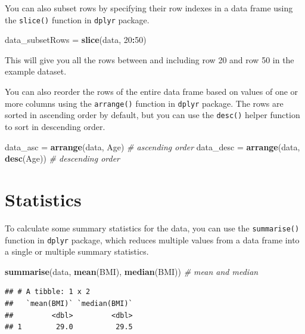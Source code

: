 \documentclass[
]{article}
\newenvironment{Shaded}{\begin{snugshade}}{\end{snugshade}}
\newcommand{\CommentTok}[1]{\textcolor[rgb]{0.56,0.35,0.01}{\textit{#1}}}
\newcommand{\DecValTok}[1]{\textcolor[rgb]{0.00,0.00,0.81}{#1}}
\newcommand{\FunctionTok}[1]{\textcolor[rgb]{0.13,0.29,0.53}{\textbf{#1}}}
\newcommand{\NormalTok}[1]{#1}
\newcommand{\OtherTok}[1]{\textcolor[rgb]{0.56,0.35,0.01}{#1}}
\newcommand{\SpecialCharTok}[1]{\textcolor[rgb]{0.81,0.36,0.00}{\textbf{#1}}}
\begin{document}
You can also subset rows by specifying their row indexes in a data frame
using the \texttt{slice()} function in \texttt{dplyr} package.

\begin{Shaded}
\begin{Highlighting}[]
\NormalTok{data\_subsetRows }\OtherTok{=} \FunctionTok{slice}\NormalTok{(data, }\DecValTok{20}\SpecialCharTok{:}\DecValTok{50}\NormalTok{)}
\end{Highlighting}
\end{Shaded}

This will give you all the rows between and including row 20 and row 50
in the example dataset.

You can also reorder the rows of the entire data frame based on values
of one or more columns using the \texttt{arrange()} function in
\texttt{dplyr} package. The rows are sorted in ascending order by
default, but you can use the \texttt{desc()} helper function to sort in
descending order.

\begin{Shaded}
\begin{Highlighting}[]
\NormalTok{data\_asc }\OtherTok{=} \FunctionTok{arrange}\NormalTok{(data, Age) }\CommentTok{\# ascending order}
\NormalTok{data\_desc }\OtherTok{=} \FunctionTok{arrange}\NormalTok{(data, }\FunctionTok{desc}\NormalTok{(Age)) }\CommentTok{\# descending order}
\end{Highlighting}
\end{Shaded}

\section{Statistics}\label{statistics}

To calculate some summary statistics for the data, you can use the
\texttt{summarise()} function in \texttt{dplyr} package, which reduces
multiple values from a data frame into a single or multiple summary
statistics.

\begin{Shaded}
\begin{Highlighting}[]
\FunctionTok{summarise}\NormalTok{(data, }\FunctionTok{mean}\NormalTok{(BMI), }\FunctionTok{median}\NormalTok{(BMI)) }\CommentTok{\# mean and median}
\end{Highlighting}
\end{Shaded}

\begin{verbatim}
## # A tibble: 1 x 2
##   `mean(BMI)` `median(BMI)`
##         <dbl>         <dbl>
## 1        29.0          29.5
\end{verbatim}
\end{document}
